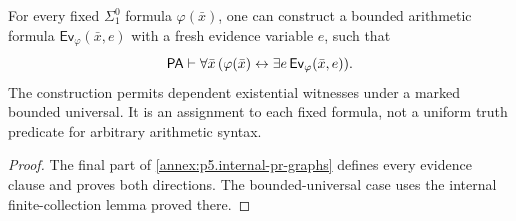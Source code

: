 \begin{theorem}
\label{thm:p05-pa-sigma-evidence}
For every fixed \(\Sigma^0_1\) formula \(\varphi(\bar x)\), one can
construct a bounded arithmetic formula \(\mathsf{Ev}_\varphi(\bar x,e)\)
with a fresh evidence variable \(e\), such that
\[
 \mathsf{PA}\vdash\forall\bar x\,
   (\varphi(\bar x)\leftrightarrow
                         \exists e\,\mathsf{Ev}_\varphi(\bar x,e)).
\]
The construction permits dependent existential witnesses under a marked
bounded universal.  It is an assignment to each fixed formula, not a
uniform truth predicate for arbitrary arithmetic syntax.
\end{theorem}
\begin{proof}
The final part of \cref{annex:p5.internal-pr-graphs} defines every evidence
clause and proves both directions.  The bounded-universal case uses the
internal finite-collection lemma proved there.
\end{proof}
